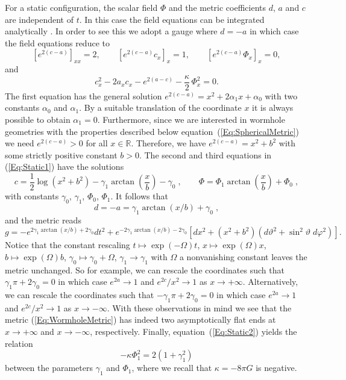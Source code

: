 \documentclass[           %
               showpacs,            %
               preprintnumbers,     %
               aps,                 %
               prd,                 %
               superscriptaddress,      %
               nofootinbib,         %
               tightenlines,        %
               floats,floatfix      %
               ]{revtex4}
\newcommand{\Real}{\mathbb{R}}
\begin{document}
For a static configuration, the scalar field $\Phi$ and the metric
coefficients $d$, $a$ and $c$ are independent of $t$. In this case the
field equations can be integrated analytically \cite{hE73,kB73}. In
order to see this we adopt a gauge where $d=-a$ in which case the
field equations reduce to
\begin{equation}
\left[ e^{2(c-a)} \right]_{xx} = 2, \qquad
\left[ e^{2(c-a)} c_x \right]_x = 1, \qquad
\left[ e^{2(c-a)}\Phi_x \right]_x = 0,
\label{Eq:Static1}
\end{equation}
and
\begin{equation}
c_x^2 - 2 a_x c_x - e^{2(a-c)} - \frac{\kappa}{2}\, \Phi_x^2 = 0.
\label{Eq:Static2}
\end{equation}
The first equation has the general solution $e^{2(c-a)} = x^2 +
2\alpha_1 x + \alpha_0$ with two constants $\alpha_0$ and
$\alpha_1$. By a suitable translation of the coordinate $x$ it is
always possible to obtain $\alpha_1=0$. Furthermore, since we are
interested in wormhole geometries with the properties described below
equation~(\ref{Eq:SphericalMetric}) we need $e^{2(c-a)} > 0$ for all
$x\in\Real$. Therefore, we have $e^{2(c-a)} = x^2 + b^2$ with some
strictly positive constant $b > 0$. The second and third equations in
(\ref{Eq:Static1}) have the solutions
\begin{equation}
c = \frac{1}{2}\log(x^2 + b^2) 
 - \gamma_1\arctan\left( \frac{x}{b} \right) - \gamma_0\; ,\qquad
\Phi = \Phi_1\arctan\left( \frac{x}{b} \right) + \Phi_0\; ,
\label{Eq:StaticWormHole1}
\end{equation}
with constants $\gamma_0$, $\gamma_1$, $\Phi_0$, $\Phi_1$. It follows
that
\begin{equation}
d = -a = \gamma_1\arctan(x/b) + \gamma_0\; ,
\label{Eq:StaticWormHole2}
\end{equation}
and the metric reads
\begin{equation}
g = -e^{2\gamma_1\arctan(x/b) + 2\gamma_0} dt^2
 + e^{-2\gamma_1\arctan(x/b) - 2\gamma_0}\left[
 dx^2 + (x^2 + b^2)\left( d\vartheta^2 + \sin^2\vartheta\; d\varphi^2 \right)
 \right].
\label{Eq:WormholeMetric}
\end{equation}
Notice that the constant rescaling $t \mapsto \exp(-\Omega) t$,
$x\mapsto \exp(\Omega) x$, $b \mapsto \exp(\Omega) b$, $\gamma_0
\mapsto \gamma_0 + \Omega$, $\gamma_1 \to \gamma_1$ with $\Omega$ a
nonvanishing constant leaves the metric unchanged. So for example, we
can rescale the coordinates such that $\gamma_1\pi + 2\gamma_0 = 0$ in
which case $e^{2a}\to 1$ and $e^{2c}/x^2\to 1$ as $x\to
+\infty$. Alternatively, we can rescale the coordinates such that
$-\gamma_1\pi + 2\gamma_0 = 0$ in which case $e^{2a}\to 1$ and
$e^{2c}/x^2\to 1$ as $x\to -\infty$. With these observations in mind
we see that the metric (\ref{Eq:WormholeMetric}) has indeed two
asymptotically flat ends at $x\to +\infty$ and $x\to -\infty$,
respectively. Finally, equation~(\ref{Eq:Static2}) yields the relation
\begin{equation}
-\kappa\Phi_1^2 = 2(1 + \gamma_1^2)
\label{Eq:WormholeParamConstr}
\end{equation}
between the parameters $\gamma_1$ and $\Phi_1$, where we recall that
$\kappa = -8\pi G$ is negative.
\end{document}
